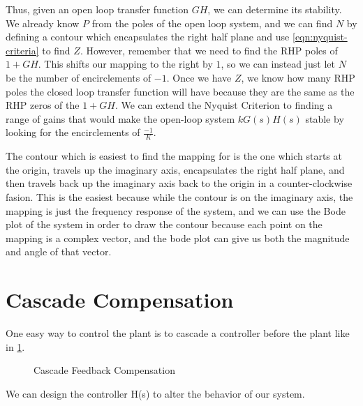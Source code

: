 Thus, given an open loop transfer function $GH$, we can determine its stability.
We already know $P$ from the poles of the open loop system, and we can find $N$ by defining a contour which encapsulates the right half plane and use \cref{eqn:nyquist-criteria} to find $Z$.
However, remember that we need to find the RHP poles of $1+GH$. This shifts our mapping to the right by $1$, so we can instead just let $N$ be the number of encirclements of $-1$.
Once we have $Z$, we know how many RHP poles the closed loop transfer function will have because they are the same as the RHP zeros of the $1+GH$.
We can extend the Nyquist Criterion to finding a range of gains that would make the open-loop system $kG(s)H(s)$ stable by looking for the encirclements of $\frac{-1}{K}$.

The contour which is easiest to find the mapping for is the one which starts at the origin, travels up the imaginary axis, encapsulates the right half plane, and then travels back up the imaginary axis back to the origin in a counter-clockwise fasion.
This is the easiest because while the contour is on the imaginary axis, the mapping is just the frequency response of the system, and we can use the Bode plot of the system in order to draw the contour because each point on the mapping is a complex vector, and the bode plot can give us both the magnitude and angle of that vector.
\section{Cascade Compensation}
One easy way to control the plant is to cascade a controller before the plant like in \cref{fig:cascade-comp}.
\begin{figure}[H]
    \centering 
    \caption{Cascade Feedback Compensation}
    \label{fig:cascade-comp}
\end{figure}
We can design the controller H(s) to alter the behavior of our system.
